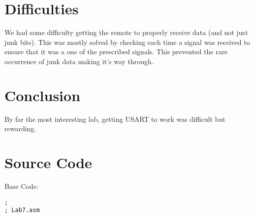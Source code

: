 \documentclass[12pt,letterpaper]{article}
\begin{document}
\section{Difficulties}
We had some difficulty getting the remote to properly receive data (and not just junk bits). This was mostly solved by checking each time a signal was received to ensure that it was a one of the prescribed signals. This prevented the rare occurrence of junk data making it's way through.

\section{Conclusion}
By far the most interesting lab, getting USART to work was difficult but rewarding. 

\section{Source Code}
Base Code:
\begin{verbatim}
;
; Lab7.asm



\end{verbatim}
\end{document}
